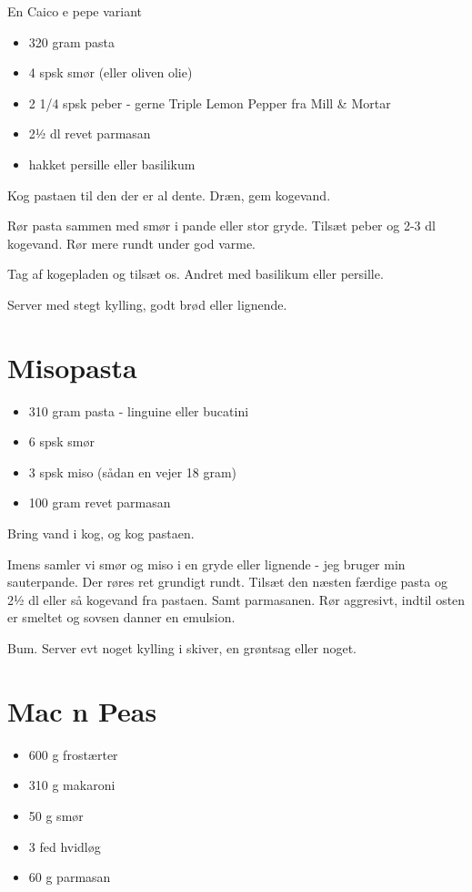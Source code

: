 \documentclass[
  letterpaper,
  DIV=11,
  numbers=noendperiod]{scrreprt}
\providecommand{\tightlist}{%
  \setlength{\itemsep}{0pt}\setlength{\parskip}{0pt}}\usepackage{longtable,booktabs,array}
\begin{document}
En Caico e pepe variant

\begin{itemize}
\tightlist
\item
  320 gram pasta
\item
  4 spsk smør (eller oliven olie)
\item
  2 1/4 spsk peber - gerne Triple Lemon Pepper fra Mill \& Mortar
\item
  2½ dl revet parmasan
\item
  hakket persille eller basilikum
\end{itemize}

Kog pastaen til den der er al dente. Dræn, gem kogevand.

Rør pasta sammen med smør i pande eller stor gryde. Tilsæt peber og 2-3
dl kogevand. Rør mere rundt under god varme.

Tag af kogepladen og tilsæt os. Andret med basilikum eller persille.

Server med stegt kylling, godt brød eller lignende.

\hypertarget{misopasta}{%
\section{Misopasta}\label{misopasta}}

\begin{itemize}
\tightlist
\item
  310 gram pasta - linguine eller bucatini
\item
  6 spsk smør
\item
  3 spsk miso (sådan en vejer 18 gram)
\item
  100 gram revet parmasan
\end{itemize}

Bring vand i kog, og kog pastaen.

Imens samler vi smør og miso i en gryde eller lignende - jeg bruger min
sauterpande. Der røres ret grundigt rundt. Tilsæt den næsten færdige
pasta og 2½ dl eller så kogevand fra pastaen. Samt parmasanen. Rør
aggresivt, indtil osten er smeltet og sovsen danner en emulsion.

Bum. Server evt noget kylling i skiver, en grøntsag eller noget.

\hypertarget{mac-n-peas}{%
\section{Mac n Peas}\label{mac-n-peas}}

\begin{itemize}
\tightlist
\item
  600 g frostærter
\item
  310 g makaroni
\item
  50 g smør
\item
  3 fed hvidløg
\item
  60 g parmasan
\end{itemize}
\end{document}
